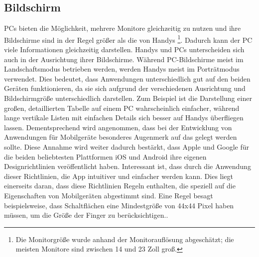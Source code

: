 \subsection{Bildschirm}
PCs bieten die Möglichkeit, mehrere Monitore gleichzeitig zu nutzen und ihre Bildschirme sind in der Regel größer als die von Handys \cite{pcVsphone_screenResolutionStats}\cite{pcVsphone_screenResolutionToSize}\footnote{Die Monitorgröße wurde anhand der Monitorauflösung abgeschätzt; die meisten Monitore sind zwischen 14 und 23 Zoll groß.}.\newline%
	Dadurch kann der PC viele Informationen gleichzeitig darstellen.\newline%
Handys und PCs unterscheiden sich auch in der Ausrichtung ihrer Bildschirme. Während PC-Bildschirme meist im Landschaftsmodus betrieben werden, werden Handys meist im Porträtmodus verwendet.\newline%
	Dies bedeutet, dass Anwendungen unterschiedlich gut auf den beiden Geräten funktionieren, da sie sich aufgrund der verschiedenen Ausrichtung und Bildschirmgröße unterschiedlich darstellen. %
		Zum Beispiel ist die Darstellung einer großen, detaillierten Tabelle auf einem PC wahrscheinlich einfacher, während lange vertikale Listen mit einfachen Details sich besser auf Handys überfliegen lassen.\newline%
Dementsprechend wird angenommen, dass bei der Entwicklung von Anwendungen für Mobilgeräte besonderes Augenmerk auf das  gelegt werden sollte. %
	Diese Annahme wird weiter dadurch bestärkt, dass Apple und Google für die beiden beliebtesten Plattformen iOS und Android\cite{pcVsphone_mobileOperatingSystem} ihre eigenen Designrichtlinien veröffentlicht haben\cite{konventionen_platforms_ios, konventionen_guidelinesGoogle}.\newline%
	Interessant ist, dass durch die Anwendung dieser Richtlinien, die App intuitiver und einfacher werden kann. %
		Dies liegt einerseits daran, dass diese Richtlinien Regeln enthalten, die speziell auf die Eigenschaften von Mobilgeräten abgestimmt sind. Eine Regel besagt beispielsweise, dass Schaltflächen eine Mindestgröße von 44x44 Pixel haben müssen, um die Größe der Finger zu berücksichtigen.\cite{konventionen_buttonSize}.\newline%
